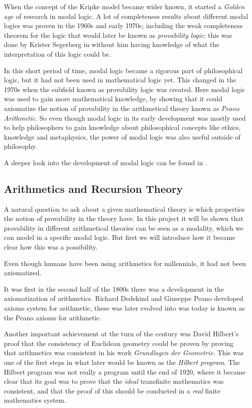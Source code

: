 \documentclass[../main.tex]{subfiles}
\begin{document}
When the concept of the Kripke model became wider known, it started a
\textit{Golden age} of research in modal logic. A lot of completeness results
about different modal logics was proven in the 1960s and early 1970s; including
the weak completeness theorem for the logic that would later be known as
\textit{provability logic}; this was done by Krister Segerberg in
\parencite{Sgerberg1971} without him having
knowledge of what the interpretation of this logic could be.

In this short period of time, modal logic became a rigorous part of
philosophical logic, but it had not been used in mathematical logic yet. This
changed in the 1970s when the subfield known as provability logic was created.
Here modal logic was used to gain more mathematical knowledge, by showing that
it could axiomatize the notion of provability in the arithmetical theory known
as \textit{Peano Arithmetic}. So even though modal logic in its early development was
mostly used to help philosophers to gain knowledge about philosophical concepts
like ethics, knowledge and metaphysics, the power of modal logic was also
useful outside of philosophy.

A deeper look into the development of modal logic can be found in
\parencite{Goldblatt2003}.
\subsection{Arithmetics and Recursion Theory}
A natural question to ask about a given mathematical theory is which properties
the notion of provability in the theory have. In this project it will be shown
that provability in different arithmetical theories  can be seen as a modality,
which we can model in a specific
modal logic. But first we will introduce how it became clear how this was a
possibility.

Even though humans have been using arithmetics for millennials, it had not been
axiomatized.

It was first in  the second half of the 1800s there was a development in the axiomatization
of arithmetics. Richard Dedekind and Giuseppe Peano developed axioms system for arithmetic,
these was later evolved into was today is known as the Peano axioms for
arithmetic. 

Another important achievement at the turn of the century was David Hilbert's
proof that the consistency of Euclidean geometry could be proven by proving
that arithmetics was consistent in his work  \textit{Grundlagen der Geometrie}.
This was one of the first steps in what later
would be known as the \textit{Hilbert program}. 
The Hilbert program was not really a program until the end of 1920, where it
became clear that its goal was to prove that the \textit{ideal} transfinite mathematics was
consistent, and that the proof of this should be conducted in a \textit{real}
finite mathematics system.
\end{document}
